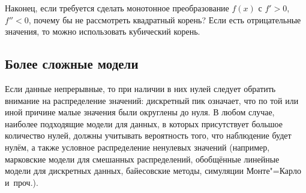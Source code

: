 \documentclass[final,pdftex]{../../template/epsilonj}
\begin{document}
Наконец, если требуется сделать монотонное преобразование $f(x)$ с $f'>0$, $f''<0$, почему бы не рассмотреть квадратный корень? Если есть отрицательные значения, то можно использовать кубический корень.

\subsection{Более сложные модели}

Если данные непрерывные, то при наличии в них нулей следует обратить внимание на распределение значений: дискретный пик означает, что по той или иной причине малые значения были округлены до нуля. В любом случае, наиболее подходящие модели для данных, в которых присутствует большое количество нулей, должны учитывать вероятность того, что наблюдение будет нулём, а также условное распределение ненулевых значений (например, марковские модели для смешанных распределений, обобщённые линейные модели для дискретных данных, байесовские методы, симуляции Монте"=Карло и~проч.).


\printbibliography
\end{document}
